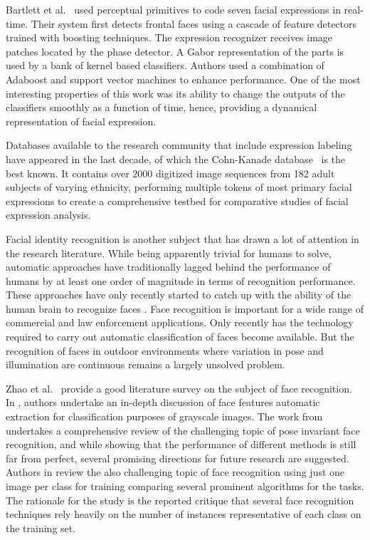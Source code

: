 \documentclass[]{article}
\begin{document}
Bartlett et al.~\cite{Bartlett4624313} used perceptual primitives to code seven facial expressions in real-time. Their system
first detects frontal faces using a cascade of feature detectors trained with boosting techniques. The expression
recognizer receives image patches located by the phase detector. A Gabor representation of the parts is used  by a bank
of kernel based classifiers. Authors used a combination of Adaboost and support vector machines to enhance performance.
One of the most interesting properties of this work was its ability to change the outputs of the classifiers smoothly
as a function of time, hence, providing a dynamical representation of facial expression.

Databases available to the research community that include expression labeling have appeared in the last decade, of
which the Cohn-Kanade database~\cite{Cohn840611} is the best known. It contains over 2000 digitized image sequences from  182
adult subjects of varying ethnicity, performing multiple tokens of most primary facial expressions to create a
comprehensive testbed for comparative studies of facial expression analysis.


Facial identity recognition is another subject that has drawn a lot of attention in the research literature. While being
apparently trivial for humans to solve, automatic approaches have traditionally lagged behind the performance of humans
by at least one order of magnitude in terms of recognition performance. These approaches have only recently started to
catch up with the ability of the human brain to recognize faces \cite{onintelligence, Rozado2012b}. Face recognition is
important  for a wide range of commercial and law enforcement applications. Only recently has the technology required to
carry out automatic classification of faces become available. But the recognition of faces in outdoor environments 
where variation in pose and illumination are continuous remains a largely unsolved problem.


Zhao et al.~\cite{Zhao:2003} provide a good literature survey on the subject of face recognition. In
\cite{Craw1987183}, authors undertake an in-depth discussion of face features automatic extraction for classification
purposes of grayscale images. The work from \cite{Zhang20092876} undertakes a comprehensive review  of the challenging
topic of pose invariant face recognition, and while showing that the performance of different methods is still far from
perfect, several promising directions for future research  are suggested. Authors in \cite{Tan20061725} review the also
challenging topic of face recognition using  just one image per class for training comparing several prominent
algorithms for the tasks. The rationale for the study is the reported critique that several face recognition techniques
rely heavily on the number of instances representative of each class on the training set.
\end{document}
